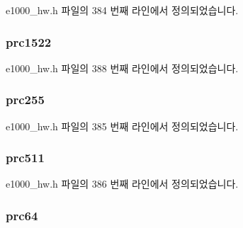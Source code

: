 e1000\+\_\+hw.\+h 파일의 384 번째 라인에서 정의되었습니다.

\subsubsection[{\texorpdfstring{prc1522}{prc1522}}]{ prc1522}\hypertarget{structe1000__hw__stats_a63ad25badd9e73392a2d41cde278de61}{}\label{structe1000__hw__stats_a63ad25badd9e73392a2d41cde278de61}


e1000\+\_\+hw.\+h 파일의 388 번째 라인에서 정의되었습니다.

\subsubsection[{\texorpdfstring{prc255}{prc255}}]{ prc255}\hypertarget{structe1000__hw__stats_ac3ecc4756db0f3b6fe4fd4e5dc9343f8}{}\label{structe1000__hw__stats_ac3ecc4756db0f3b6fe4fd4e5dc9343f8}


e1000\+\_\+hw.\+h 파일의 385 번째 라인에서 정의되었습니다.

\subsubsection[{\texorpdfstring{prc511}{prc511}}]{ prc511}\hypertarget{structe1000__hw__stats_afa5ad4048ffa53907acbb32d6e922c82}{}\label{structe1000__hw__stats_afa5ad4048ffa53907acbb32d6e922c82}


e1000\+\_\+hw.\+h 파일의 386 번째 라인에서 정의되었습니다.

\subsubsection[{\texorpdfstring{prc64}{prc64}}]{ prc64}\hypertarget{structe1000__hw__stats_aa14e816d883f7e8d3387ab080c53e923}{}\label{structe1000__hw__stats_aa14e816d883f7e8d3387ab080c53e923}


